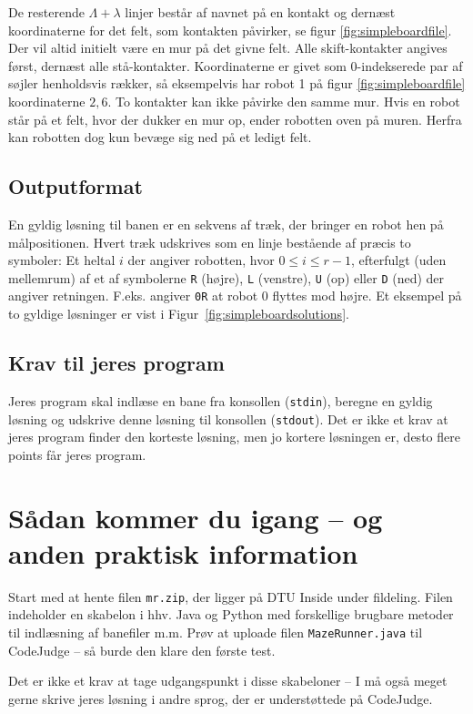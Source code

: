 \documentclass[10pt, a4paper]{article}
\begin{document}
De resterende $\Lambda+\lambda$ linjer består af navnet på en kontakt og dernæst koordinaterne for det felt, som kontakten påvirker, se figur \ref{fig:simpleboardfile}.
Der vil altid initielt være en mur på det givne felt.
Alle skift-kontakter angives først, dernæst alle stå-kontakter.
Koordinaterne er givet som 0-indekserede par af søjler henholdsvis rækker, så eksempelvis har robot 1 på figur \ref{fig:simpleboardfile} koordinaterne $2, 6$.
To kontakter kan ikke påvirke den samme mur.
Hvis en robot står på et felt, hvor der dukker en mur op, ender robotten oven på muren.
Herfra kan robotten dog kun bevæge sig ned på et ledigt felt.

\subsection{Outputformat}
En gyldig løsning til banen er en sekvens af træk, der bringer en robot hen på målpositionen.
Hvert træk udskrives som en linje bestående af præcis to symboler: Et heltal $i$ der angiver robotten, hvor $0 \leq i \leq r-1$, efterfulgt (uden mellemrum) af et af symbolerne \texttt{R} (højre), \texttt{L} (venstre), \texttt{U} (op) eller \texttt{D} (ned) der angiver retningen.
F.eks. angiver \texttt{0R} at robot 0 flyttes mod højre. Et eksempel på to gyldige løsninger er vist i Figur~\ref{fig:simpleboardsolutions}.

\subsection{Krav til jeres program}
Jeres program skal indlæse en bane fra konsollen (\texttt{stdin}), beregne en gyldig løsning og udskrive denne løsning til konsollen (\texttt{stdout}).
Det er ikke et krav at jeres program finder den korteste løsning, men jo kortere løsningen er, desto flere points får jeres program.

\section{Sådan kommer du igang -- og anden praktisk information}
Start med at hente filen \texttt{mr.zip}, der ligger på DTU Inside under fildeling.
Filen indeholder en skabelon i hhv. Java og Python med forskellige brugbare metoder til indlæsning af banefiler m.m.
Prøv at uploade filen \texttt{MazeRunner.java} til CodeJudge -- så burde den klare den første test.

Det er ikke et krav at tage udgangspunkt i disse skabeloner -- I må også meget gerne skrive jeres løsning i andre sprog, der er understøttede på CodeJudge.
\end{document}
